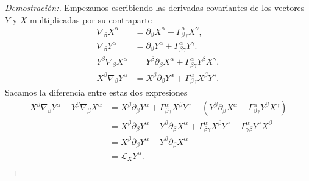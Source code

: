 \begin{proof}[Demostración:]
    Empezamos escribiendo las derivadas covariantes de los vectores $Y$ y $X$ multiplicadas por su contraparte
    \begin{align*}
        \nabla_\beta X^\alpha & =\partial_\beta X^\alpha+\Gamma_{\beta \gamma}^\alpha X^\gamma ,\\
        \nabla_\beta Y^\alpha & =\partial_\beta Y^\alpha+\Gamma_{\beta \gamma}^\alpha Y^\gamma .\\
        Y^\beta \nabla_\beta X^\alpha & =Y^\beta \partial_\beta X^\alpha+\Gamma_{\beta \gamma}^\alpha Y^\beta X^\gamma  ,\\
        X^\beta \nabla_\beta Y^\alpha & =X^\beta \partial_\beta Y^\alpha+\Gamma_{\beta \gamma}^\alpha X^\beta Y^\gamma.
    \end{align*}
    Sacamos la diferencia entre estas dos expresiones
    \begin{equation}
        \begin{aligned}
            X^\beta \nabla_\beta Y^\alpha  - Y^\beta \nabla_\beta X^\alpha & = X^\beta \partial_\beta Y^\alpha+\Gamma_{\beta \gamma}^\alpha X^\beta Y^\gamma- (Y^\beta \partial_\beta X^\alpha+\Gamma_{\beta \gamma}^\alpha Y^\beta X^\gamma )   \\
                                                                           & = X^\beta \partial_\beta Y^\alpha - Y^\beta \partial_\beta X^\alpha+\Gamma_{\beta \gamma}^\alpha  X^\beta Y^\gamma -\Gamma_{ \gamma \beta}^\alpha Y^\gamma  X^\beta \\
                                                                           & =X^\beta \partial_\beta Y^\alpha - Y^\beta \partial_\beta X^\alpha                                                                                                  \\
                                                                           & = \mathscr{L}_X Y^\alpha .                                                                                                                                          \\
        \end{aligned}
    \end{equation}
\end{proof}


